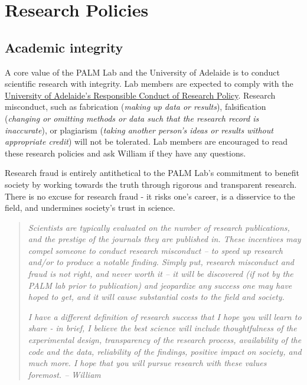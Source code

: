 \documentclass[
]{book}
\begin{document}
\hypertarget{research-policies}{%
\chapter{Research Policies}\label{research-policies}}

\hypertarget{academic-integrity}{%
\section{Academic integrity}\label{academic-integrity}}

A core value of the PALM Lab and the University of Adelaide is to conduct scientific research with integrity. Lab members are expected to comply with the \href{https://www.adelaide.edu.au/policies/96/}{University of Adelaide's Responsible Conduct of Research Policy}. Research misconduct, such as fabrication (\emph{making up data or results}), falsification (\emph{changing or omitting methods or data such that the research record is inaccurate}), or plagiarism (\emph{taking another person's ideas or results without appropriate credit}) will not be tolerated. Lab members are encouraged to read these research policies and ask William if they have any questions.

Research fraud is entirely antithetical to the PALM Lab's commitment to benefit society by working towards the truth through rigorous and transparent research. There is no excuse for research fraud - it risks one's career, is a disservice to the field, and undermines society's trust in science.

\begin{quote}
\emph{Scientists are typically evaluated on the number of research publications, and the prestige of the journals they are published in. These incentives may compel someone to conduct research misconduct -- to speed up research and/or to produce a notable finding. Simply put, research misconduct and fraud is not right, and never worth it -- it will be discovered (\emph{if not by the PALM lab prior to publication}) and jeopardize any success one may have hoped to get, and it will cause substantial costs to the field and society.}

\emph{I have a different definition of research success that I hope you will learn to share - in brief, I believe the best science will include thoughtfulness of the experimental design, transparency of the research process, availability of the code and the data, reliability of the findings, positive impact on society, and much more. I hope that you will pursue research with these values foremost. -- William}
\end{quote}
\end{document}

